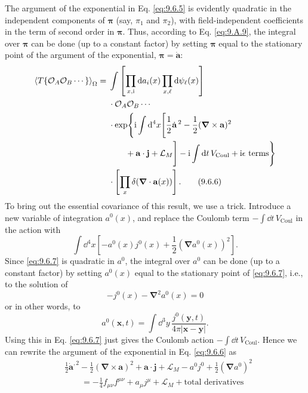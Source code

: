 The argument of the exponential in Eq. \eqref{eq:9.6.5} is evidently quadratic in the
independent components of $\boldsymbol\pi$ (say, $\pi_1$ and $\pi_2$), with
field-independent coefficients in the term of second order in
$\boldsymbol\pi$. Thus, according to Eq. \eqref{eq:9.A.9}, the integral over
$\boldsymbol\pi$ can be done (up to a constant factor) by setting
$\boldsymbol\pi$ equal to the stationary point of the argument of the
exponential, $\boldsymbol\pi=\dot{\mathbf a}$:
\begin{align}
\left\langle T\{\mathcal O_A\mathcal O_B\cdots\}\right\rangle_{\Omega}
={}&\int\left[\prod_{x,\mathrm{i}}\mathop{}\!\mathrm{d} a_i(x)\prod_{x,\ell}\mathop{}\!\mathrm{d}\psi_\ell(x)\right]
\notag\\
&\cdot\mathcal O_A\mathcal O_B\cdots
\notag\\
&\cdot\exp\Biggl\{\mathrm{i}\int \mathop{}\!\mathrm{d}^4x\Biggl[
 \frac12\dot{\mathbf a}^{\,2}
 -\frac12(\boldsymbol\nabla\times\mathbf a)^2
\notag\\
&\qquad+\mathbf a\cdot\mathbf j+\mathcal L_M\Biggr]
 -\mathrm{i}\int \mathop{}\!\mathrm{d} t\,V_{\mathrm{Coul}}+\mathrm{i}\epsilon\text{ terms}\Biggr\}
\notag\\
&\cdot\left[\prod_x\delta(\boldsymbol\nabla\cdot\mathbf a(x))\right].
\tag{9.6.6}\label{eq:9.6.6}
\end{align}
To bring out the essential covariance of this result, we use a trick.
Introduce a new variable of integration $a^0(x)$, and replace the Coulomb term
$-\int \dd t\,V_{\mathrm{Coul}}$ in the action with
\begin{equation}
\int \dd^4x\left[-a^0(x)j^0(x)+\frac12
 (\boldsymbol\nabla a^0(x))^2\right].
\tag{9.6.7}\label{eq:9.6.7}
\end{equation}
Since \eqref{eq:9.6.7} is quadratic in $a^0$, the integral over $a^0$ can be done (up
to a constant factor) by setting $a^0(x)$ equal to the stationary point of
\eqref{eq:9.6.7}, i.e., to the solution of
\[
-j^0(x)-\boldsymbol\nabla^2a^0(x)=0
\]
or in other words, to
\begin{equation}
a^0(\mathbf{x},t)=\int \dd^3y\,
 \frac{j^0(\mathbf{y},t)}{4\pi|\mathbf{x}-\mathbf{y}|}.
\tag{9.6.8}\label{eq:9.6.8}
\end{equation}
Using this in Eq. \eqref{eq:9.6.7} just gives the Coulomb action
$-\int \dd t\,V_{\mathrm{Coul}}$. Hence we can rewrite the argument of the
exponential in Eq. \eqref{eq:9.6.6} as
\begin{align*}
&\frac12\dot{\mathbf a}^{,2}
 -\frac12(\boldsymbol\nabla\times\mathbf a)^2
 +\mathbf a\cdot\mathbf j+\mathcal L_M-a^0j^0
 +\frac12(\boldsymbol\nabla a^0)^2
\\
&\qquad=-\frac14f_{\mu\nu}f^{\mu\nu}+a_\mu j^\mu
 +\mathcal L_M+\text{total derivatives}
\end{align*}
